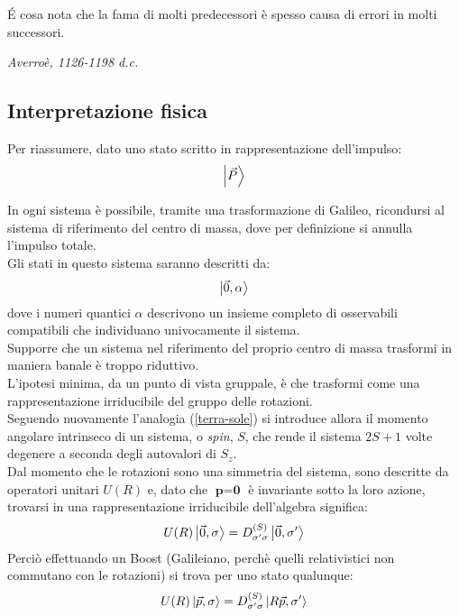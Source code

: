 \documentclass[twoside]{article}
\renewcommand{\vec}[1]{\textbf{#1}}
\begin{document}
\vspace{9mm}
\epigraph{\'E cosa nota che la fama di molti predecessori è spesso causa di errori in molti successori.}{\textit{Averroè, 1126-1198 d.c.}}
\vspace{9mm}

\subsection{Interpretazione fisica}
Per riassumere, dato uno stato scritto in rappresentazione dell'impulso:
\begin{equation}
    \ket{\Vec{P}}
\end{equation}

In ogni sistema è possibile, tramite una trasformazione di Galileo, ricondursi al sistema di riferimento del centro di massa, dove per definizione si annulla l'impulso totale. 
\\
Gli stati in questo sistema saranno descritti da:
\begin{equation}
    \ket{\Vec{0},\alpha}
\end{equation}
dove i numeri quantici $\alpha$ descrivono un insieme completo di osservabili compatibili che individuano univocamente il sistema.
\\
Supporre che un sistema nel riferimento del proprio centro di massa trasformi in maniera banale è troppo riduttivo.
\\
L'ipotesi minima, da un punto di vista gruppale, è che trasformi come una rappresentazione irriducibile del gruppo delle rotazioni.
\\
Seguendo nuovamente l'analogia (\ref{terra-sole}) si introduce allora il momento angolare intrinseco di un sistema, o \textit{spin}, $S$, che rende il sistema $2S+1$ volte degenere a seconda degli autovalori di $S_z$.
\\
Dal momento che le rotazioni sono una simmetria del sistema, sono descritte da operatori unitari $U(R)$ e, dato che $\vec{p}=\vec{0}$ è invariante sotto la loro azione, trovarsi in una rappresentazione irriducibile dell'algebra significa:
\begin{equation}
    U(R)\ket{\Vec{0},\sigma}=D^{(S)}_{\sigma' \sigma}\ket{\Vec{0},\sigma'}
\end{equation}
Perciò effettuando un Boost (Galileiano, perchè quelli relativistici non commutano con le rotazioni) si trova per uno stato qualunque:
\begin{equation}
    U(R)\ket{\Vec{p},\sigma}=D^{(S)}_{\sigma' \sigma}\ket{R\Vec{p},\sigma'}
\end{equation}
\end{document}
